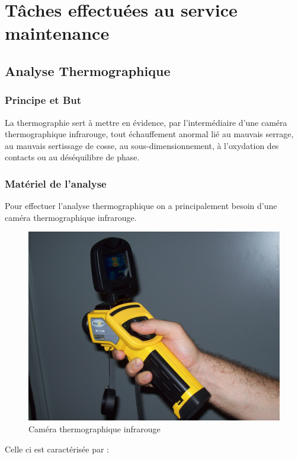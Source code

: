 \section{Tâches effectuées au service maintenance}

\subsection{Analyse Thermographique}

\subsubsection{Principe et But}

La thermographie sert à mettre en évidence, par l'intermédiaire d'une caméra thermographique infrarouge, tout échauffement anormal lié au mauvais serrage, au mauvais sertissage de cosse, au sous-dimensionnement, à l'oxydation des contacts ou au déséquilibre de phase.

\subsubsection{Matériel de l'analyse}


Pour effectuer l'analyse thermographique on a principalement besoin d'une caméra thermographique infrarouge.
\begin{figure}[hbtp]
\centering
\includegraphics[scale=0.07]{./Figures/infra.JPG}
\caption{Caméra thermographique infrarouge}
\end{figure}
Celle ci est caractérisée par :

